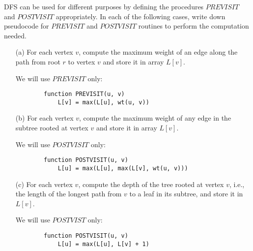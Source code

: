 \documentclass{article}
\begin{document}
DFS can be used for different purposes by defining the procedures $PREVISIT$ and $POSTVISIT$ appropriately. In each of the following cases, write down pseudocode for $PREVISIT$ and $POSTVISIT$ routines to perform the computation needed.
    \begin{itemize}
        \item [(a)] For each vertex $v$, compute the maximum weight of an edge along the path from root $r$ to vertex $v$ and store it in array $L[v]$.
            \begin{answer}
                We will use $PREVISIT$ only:
                    \begin{verbatim}
        function PREVISIT(u, v)
            L[v] = max(L[u], wt(u, v))
                    \end{verbatim}
            \end{answer}

        \item [(b)] For each vertex $v$, compute the maximum weight of any edge in the subtree rooted at vertex $v$ and store it in array $L[v]$.
            \begin{answer}
                We will use $POSTVISIT$ only:
                    \begin{verbatim}
        function POSTVISIT(u, v)
            L[u] = max(L[u], max(L[v], wt(u, v)))
                    \end{verbatim}
            \end{answer}

        \item [(c)] For each vertex $v$, compute the depth of the tree rooted at vertex $v$, i.e., the length of the longest path from $v$ to a leaf in its subtree, and store it in $L[v]$.
            \begin{answer}
                We will use $POSTVIST$ only:
                    \begin{verbatim}
        function POSTVISIT(u, v)
            L[u] = max(L[u], L[v] + 1)
                    \end{verbatim}
            \end{answer}


\end{itemize}
\end{document}
